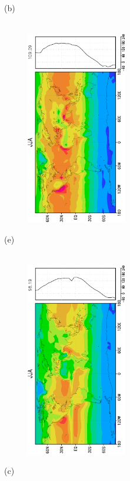 \documentclass[12pt,a4paper,twoside,openright,headinclude,liststotoc,bibtotoc]{scrreprt}
\begin{document}
\begin{figure}[H]
{}
\parbox{8.5cm}{\hspace{0.50cm}\begin{scriptsize}(b)\end{scriptsize} \vspace{-0.7cm} \\
\includegraphics[height=8.5cm,width=6.5cm,angle=-90]
{eps/zonalysmsfcnetradJJA.eps}
}
\parbox{8.5cm}{\hspace{0.50cm}\begin{scriptsize}(e)\end{scriptsize} \vspace{-0.7cm} \\
\includegraphics[height=8.5cm,width=6.5cm,angle=-90]
{eps/zonalfinalt21ysmsfcnetradJJA.eps}
}
\parbox{8.5cm}{\hspace{0.50cm}\begin{scriptsize}(c)\end{scriptsize} \vspace{-0.7cm} \\
}
\end{figure}
\end{document}
